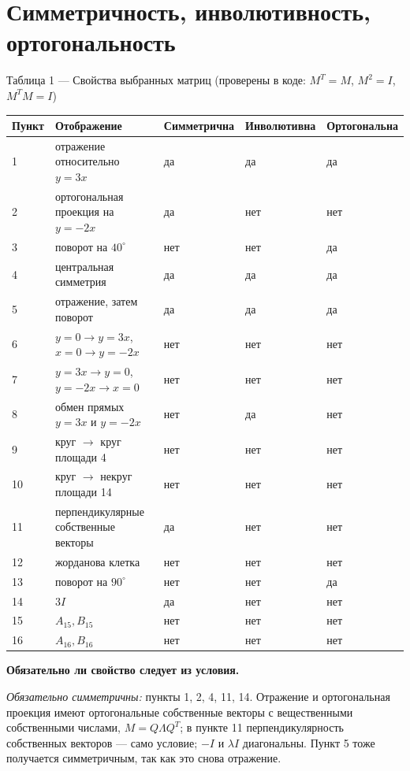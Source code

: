 \documentclass[a4paper,14pt]{extarticle}
\begin{document}
\hypertarget{ux441ux438ux43cux43cux435ux442ux440ux438ux447ux43dux43eux441ux442ux44c-ux438ux43dux432ux43eux43bux44eux442ux438ux432ux43dux43eux441ux442ux44c-ux43eux440ux442ux43eux433ux43eux43dux430ux43bux44cux43dux43eux441ux442ux44c}{%
\section{Симметричность, инволютивность,
ортогональность}\label{ux441ux438ux43cux43cux435ux442ux440ux438ux447ux43dux43eux441ux442ux44c-ux438ux43dux432ux43eux43bux44eux442ux438ux432ux43dux43eux441ux442ux44c-ux43eux440ux442ux43eux433ux43eux43dux430ux43bux44cux43dux43eux441ux442ux44c}}

Таблица 1 --- Свойства выбранных матриц (проверены в коде: \(M^T=M\),
\(M^2=I\), \(M^TM=I\))

\small\begin{longtable}{@{}p{1.3cm}p{5.0cm}p{2.8cm}p{2.8cm}p{2.8cm}@{}}
\toprule
Пункт & Отображение & Симметрична & Инволютивна &
Ортогональна\tabularnewline
\midrule
\endhead
1 & отражение относительно \(y=3x\) & да & да & да\tabularnewline
2 & ортогональная проекция на \(y=-2x\) & да & нет & нет\tabularnewline
3 & поворот на \(40^\circ\) & нет & нет & да\tabularnewline
4 & центральная симметрия & да & да & да\tabularnewline
5 & отражение, затем поворот & да & да & да\tabularnewline
6 & \(y=0\to y=3x\), \(x=0\to y=-2x\) & нет & нет & нет\tabularnewline
7 & \(y=3x\to y=0\), \(y=-2x\to x=0\) & нет & нет & нет\tabularnewline
8 & обмен прямых \(y=3x\) и \(y=-2x\) & нет & да & нет\tabularnewline
9 & круг \(\to\) круг площади 4 & нет & нет & нет\tabularnewline
10 & круг \(\to\) некруг площади 14 & нет & нет & нет\tabularnewline
11 & перпендикулярные собственные векторы & да & нет &
нет\tabularnewline
12 & жорданова клетка & нет & нет & нет\tabularnewline
13 & поворот на \(90^\circ\) & нет & нет & да\tabularnewline
14 & \(3I\) & да & нет & нет\tabularnewline
15 & \(A_{15},B_{15}\) & нет & нет & нет\tabularnewline
16 & \(A_{16},B_{16}\) & нет & нет & нет\tabularnewline
\bottomrule
\end{longtable}\normalsize

\textbf{Обязательно ли свойство следует из условия.}

\emph{Обязательно симметричны:} пункты 1, 2, 4, 11, 14. Отражение и
ортогональная проекция имеют ортогональные собственные векторы с
вещественными собственными числами, \(M=Q\Lambda Q^T\); в пункте 11
перпендикулярность собственных векторов --- само условие; \(-I\) и
\(\lambda I\) диагональны. Пункт 5 тоже получается симметричным, так как
это снова отражение.
\end{document}
